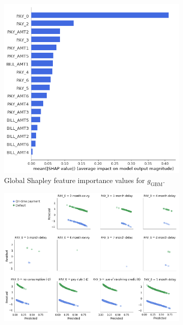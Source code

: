 \documentclass[fleqn]{article}
\begin{document}
\begin{itemize}
\begin{figure}
	\begin{subfigure}{.4\textwidth}
  		\includegraphics[height=1.17\linewidth, width=1.05\linewidth]{img/global_shap.png}
  		\caption{Global Shapley feature importance values for $g_{\text{GBM}}$.}
  		\label{fig:global_shap}
	\end{subfigure}\hspace{10pt}
	\begin{subfigure}{.5\textwidth}
		\includegraphics[width=1.2\linewidth]{img/resid.png}

\end{subfigure}
\end{figure}
\end{itemize}
\end{document}
